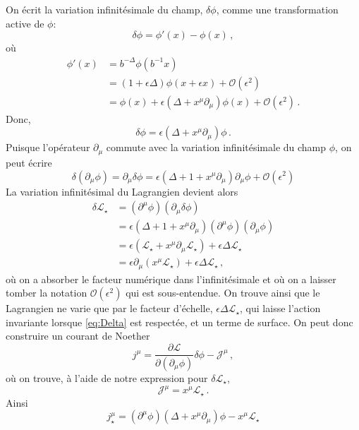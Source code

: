 \documentclass{article}
\numberwithin{equation}{section}
\theoremstyle{solution}
\begin{document}
On écrit la variation infinitésimale du champ, $\delta \phi$, comme une transformation active de $\phi$:
\begin{equation}
       \delta \phi = \phi'(x) - \phi(x) \, ,
\end{equation} 
où
\begin{align*}
        \phi'(x) &= b^{-\Delta}\phi(b^{-1}x) \\
              &= (1 + \epsilon\Delta) \phi(x + \epsilon x) + \mathcal{O}(\epsilon^{2}) \\
              &= \phi(x) + \epsilon(\Delta + x^{\mu}\partial_{\mu})\phi(x) + \mathcal{O}(\epsilon^{2})\, .
\end{align*}
Donc,
\begin{equation}
        \delta \phi = \epsilon(\Delta + x^\mu \partial_\mu)\phi\, .
\end{equation} 
Puisque l'opérateur $\partial_\mu$ commute avec la variation infinitésimale du champ $\phi$, on peut écrire
\begin{equation}
         \delta (\partial_\mu \phi) = \partial_{\mu}\delta\phi =  \epsilon(\Delta + 1 + x^{\mu}\partial_\mu)\partial_\mu \phi + \mathcal{O}(\epsilon^2)
\end{equation} 
La variation infinitésimal du Lagrangien devient alors
\begin{align*}
        \delta  \mathcal{L}_\star &= (\partial^\mu \phi)(\partial_\mu \delta \phi) \\
                &= \epsilon (\Delta + 1 + x^\mu \partial_\mu)(\partial^\mu \phi) (\partial_\mu \phi) \\
                &= \epsilon (\mathcal{L}_\star + x^\mu \partial_\mu \mathcal{L}_\star) + \epsilon \Delta \mathcal{L}_\star\\
                &= \epsilon \partial_\mu (x^\mu \mathcal{L}_\star) + \epsilon \Delta \mathcal{L}_\star\, ,
\end{align*}
où on a absorber le facteur numérique dans l'infinitésimale et où on a laisser tomber la notation $\mathcal{O}(\epsilon^2)$ qui est sous-entendue. 
On trouve ainsi que le Lagrangien ne varie que par le facteur d'échelle, $\epsilon\Delta \mathcal{L}_\star$, qui laisse l'action invariante lorsque \eqref{eq:Delta} est respectée, et un terme de surface. 
On peut donc construire un courant de Noether
\begin{equation}
        j^{\mu} = \frac{\partial \mathcal{L}}{\partial (\partial_{\mu}\phi)} \delta  \phi  - \mathcal{J}^{\mu}\, ,
\end{equation} 
où on trouve, à l'aide de notre expression pour $\delta \mathcal{L}_\star$,
\begin{equation}
        \mathcal{J}^{\mu} = x^{\mu}\mathcal{L}_\star\, .
\end{equation} 
Ainsi
\begin{equation}\label{eq:Noether current}
        \boxed{j^{\mu}_\star = (\partial^{\mu} \phi)(\Delta + x^{\mu}\partial_{\mu})\phi - x^{\mu}\mathcal{L}_\star}
\end{equation} 
\end{document}
